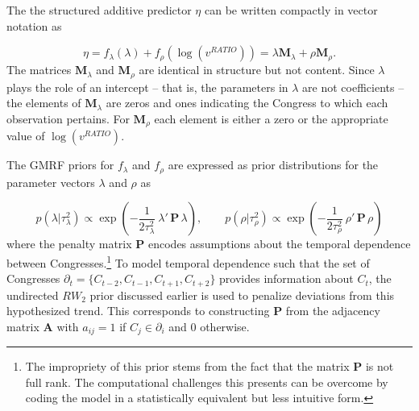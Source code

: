 The the structured additive predictor $\eta$ can be written compactly in vector notation as 

{\singlespacing
$$ \eta = f_\lambda(\lambda) +  f_\rho(\log{(v^{RATIO})}) = \lambda \mathbf{M}_\lambda + \rho \mathbf{M}_\rho.$$
}
%
The matrices $\mathbf{M}_\lambda$ and $\mathbf{M}_\rho$ are identical in structure but not content. Since $\lambda$ plays the role of an intercept -- that is, the parameters in $\lambda$ are not coefficients -- the elements of $\mathbf{M}_\lambda$ are zeros and ones indicating the Congress to which each observation pertains. For $\mathbf{M}_\rho$ each element is either a zero or the appropriate value of $\log{(v^{RATIO})}$. 


The GMRF priors for $f_{\lambda}$ and $f_{\rho}$ are expressed as prior distributions for the parameter vectors $\lambda$ and $\rho$ as 

{\singlespacing
$$ 
p(\lambda | \tau_\lambda^2) \propto \exp{\left(-\frac{1}{2\tau_\lambda^2} \: \lambda' \, \mathbf{P}  \, \lambda \right)}, 
\qquad
p(\rho | \tau_\rho^2) \propto \exp{\left(-\frac{1}{2\tau_\rho^2} \: \rho' \, \mathbf{P} \, \rho \right)}
 $$
}
%
\noindent where the penalty matrix $\mathbf{P}$ encodes assumptions about the temporal dependence between Congresses.\footnote{The impropriety of this prior stems from the fact that the matrix  $\mathbf{P}$ is not full rank.  The computational challenges this presents can be overcome by coding the model in a statistically equivalent but less intuitive form.} To model temporal dependence such that the set of Congresses $\partial_t = \{C_{t-2}, C_{t-1}, C_{t+1}, C_{t + 2} \}$ provides information about $C_t$, the undirected $RW_2$ prior discussed earlier is used to penalize deviations from this hypothesized trend. This corresponds to constructing $\mathbf{P}$ from the adjacency matrix $\mathbf{A}$ with $a_{ij} = 1$ if $C_j \in \partial_i$ and 0 otherwise.


